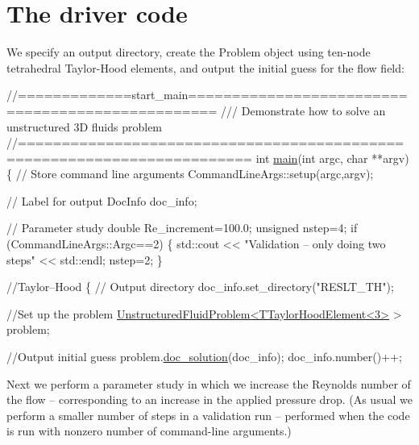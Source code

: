  

\hypertarget{index_main}{}\section{The driver code}\label{index_main}
We specify an output directory, create the {\ttfamily Problem} object using ten-\/node tetrahedral Taylor-\/\+Hood elements, and output the initial guess for the flow field\+:


\begin{DoxyCodeInclude}
\textcolor{comment}{//=============start\_main=================================================}
\textcolor{comment}{/// Demonstrate how to solve an unstructured 3D fluids problem}
\textcolor{comment}{}\textcolor{comment}{//========================================================================}
\textcolor{keywordtype}{int} \hyperlink{unstructured__three__d__fluid_8cc_a3c04138a5bfe5d72780bb7e82a18e627}{main}(\textcolor{keywordtype}{int} argc, \textcolor{keywordtype}{char} **argv)
\{
 \textcolor{comment}{// Store command line arguments}
 CommandLineArgs::setup(argc,argv);
  
 \textcolor{comment}{// Label for output}
 DocInfo doc\_info;
 
 \textcolor{comment}{// Parameter study}
 \textcolor{keywordtype}{double} Re\_increment=100.0;
 \textcolor{keywordtype}{unsigned} nstep=4;
 \textcolor{keywordflow}{if} (CommandLineArgs::Argc==2)
  \{
   std::cout << \textcolor{stringliteral}{"Validation -- only doing two steps"} << std::endl;
   nstep=2;
  \}
 
 
 \textcolor{comment}{//Taylor--Hood}
 \{
  \textcolor{comment}{// Output directory}
  doc\_info.set\_directory(\textcolor{stringliteral}{"RESLT\_TH"});
  
  \textcolor{comment}{//Set up the problem}
  \hyperlink{classUnstructuredFluidProblem}{UnstructuredFluidProblem<TTaylorHoodElement<3>} > problem;
  
  \textcolor{comment}{//Output initial guess}
  problem.\hyperlink{classUnstructuredFluidProblem_abcc9f0065665ae5239988b1a812e3f78}{doc\_solution}(doc\_info);
  doc\_info.number()++;   

\end{DoxyCodeInclude}


Next we perform a parameter study in which we increase the Reynolds number of the flow -- corresponding to an increase in the applied pressure drop. (As usual we perform a smaller number of steps in a validation run -- performed when the code is run with nonzero number of command-\/line arguments.)



